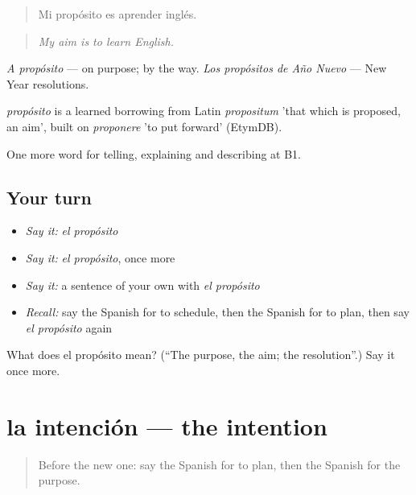 \begin{quote}
Mi propósito es aprender inglés.
\end{quote}

\begin{quote}
\emph{My aim is to learn English.}
\end{quote}

\emph{A propósito} — on purpose; by the way. \emph{Los propósitos de Año Nuevo} — New Year resolutions.

\begin{cousinweb}
\emph{propósito} is a learned borrowing from Latin \emph{propositum} 'that which is proposed, an aim', built on \emph{proponere} 'to put forward' (EtymDB).
\end{cousinweb}

\begin{grammarlens}[title={What you've built}]
One more word for telling, explaining and describing at B1.
\end{grammarlens}

\subsection*{Your turn}
\begin{itemize}
\raggedright
  \item \emph{Say it:} \emph{el propósito}
  \item \emph{Say it:} \emph{el propósito}, once more
  \item \emph{Say it:} a sentence of your own with \emph{el propósito}
  \item \emph{Recall:} say the Spanish for to schedule, then the Spanish for to plan, then say \emph{el propósito} again
\end{itemize}

\begin{tcolorbox}[breakable,colback=teal!4,colframe=teal!35!black,title={Before you move on}]
What does el propósito mean? (\textquotedblleft{}The purpose, the aim; the resolution\textquotedblright{}.) Say it once more.
\end{tcolorbox}
\section[la intención]{la intención — the intention}

\label{lesson:ES-C615-intencion}



\begin{quote}
Before the new one: say the Spanish for to plan, then the Spanish for the purpose.
\end{quote}

